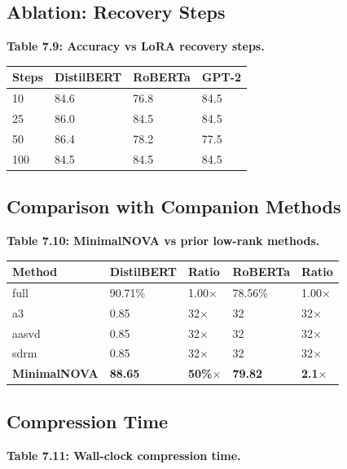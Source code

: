 \subsection{Ablation: Recovery Steps}

\textbf{Table 7.9: Accuracy vs LoRA recovery steps.}

\begin{table}[H]
\centering
\small
\begin{tabular}{llll}
\toprule
\textbf{Steps} & \textbf{DistilBERT} & \textbf{RoBERTa} & \textbf{GPT-2} \\
\midrule
10 & 84.6 & 76.8 & 84.5 \\
25 & 86.0 & 84.5 & 84.5 \\
50 & 86.4 & 78.2 & 77.5 \\
100 & 84.5 & 84.5 & 84.5 \\
\bottomrule
\end{tabular}
\end{table}

\subsection{Comparison with Companion Methods}

\textbf{Table 7.10: MinimalNOVA vs prior low-rank methods.}

\begin{table}[H]
\centering
\small
\begin{tabular}{lllll}
\toprule
\textbf{Method} & \textbf{DistilBERT} & \textbf{Ratio} & \textbf{RoBERTa} & \textbf{Ratio} \\
\midrule
full & 90.71\% & 1.00$\times$ & 78.56\% & 1.00$\times$ \\
a3 & 0.85 & 32$\times$ & 32 & 32$\times$ \\
aasvd & 0.85 & 32$\times$ & 32 & 32$\times$ \\
sdrm & 0.85 & 32$\times$ & 32 & 32$\times$ \\
\textbf{MinimalNOVA} & \textbf{88.65} & \textbf{50\%$\times$} & \textbf{79.82} & \textbf{2.1$\times$} \\
\bottomrule
\end{tabular}
\end{table}

\subsection{Compression Time}

\textbf{Table 7.11: Wall-clock compression time.}

